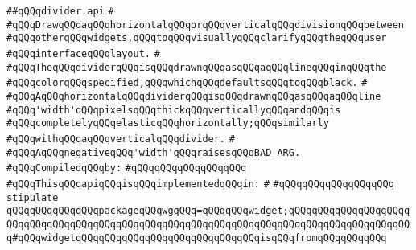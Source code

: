 \label{src/lib/x-kit/widget/old/leaf/divider.api}
\verb|##qQQqdivider.api|\newline
\verb|#|\newline
\verb|#qQQqDrawqQQqaqQQqhorizontalqQQqorqQQqverticalqQQqdivisionqQQqbetween|\newline
\verb|#qQQqotherqQQqwidgets,qQQqtoqQQqvisuallyqQQqclarifyqQQqtheqQQquser|\newline
\verb|#qQQqinterfaceqQQqlayout.|\newline
\verb|#|\newline
\verb|#qQQqTheqQQqdividerqQQqisqQQqdrawnqQQqasqQQqaqQQqlineqQQqinqQQqthe|\newline
\verb|#qQQqcolorqQQqspecified,qQQqwhichqQQqdefaultsqQQqtoqQQqblack.|\newline
\verb|#|\newline
\verb|#qQQqAqQQqhorizontalqQQqdividerqQQqisqQQqdrawnqQQqasqQQqaqQQqline|\newline
\verb|#qQQq'width'qQQqpixelsqQQqthickqQQqverticallyqQQqandqQQqis|\newline
\verb|#qQQqcompletelyqQQqelasticqQQqhorizontally;qQQqsimilarly|\newline
\verb|#qQQqwithqQQqaqQQqverticalqQQqdivider.|\newline
\verb|#|\newline
\verb|#qQQqAqQQqnegativeqQQq'width'qQQqraisesqQQqBAD_ARG.|\newline
\newline
\verb|#qQQqCompiledqQQqby:|\newline
\verb|#qQQqqQQqqQQqqQQqqQQq|\newline
\newline
\verb|#qQQqThisqQQqapiqQQqisqQQqimplementedqQQqin:|\newline
\verb|#|\newline
\verb|#qQQqqQQqqQQqqQQqqQQq|\newline
\newline
\verb|stipulate|\newline
\verb|qQQqqQQqqQQqqQQqpackageqQQqwgqQQq=qQQqqQQqwidget;qQQqqQQqqQQqqQQqqQQqqQQqqQQqqQQqqQQqqQQqqQQqqQQqqQQqqQQqqQQqqQQqqQQqqQQqqQQqqQQqqQQqqQQqqQQq#qQQqwidgetqQQqqQQqqQQqqQQqqQQqqQQqqQQqqQQqisqQQqfromqQQqqQQqqQQq|\newline
